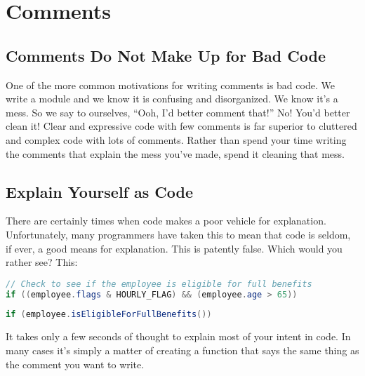 
\chapter{Comments}

\section{Comments Do Not Make Up for Bad Code}

One of the more common motivations for writing comments is bad code. We write a module
and we know it is confusing and disorganized. We know it's a mess. So we say to ourselves,
“Ooh, I'd better comment that!” No! You'd better clean it!
Clear and expressive code with few comments is far superior to cluttered and complex
code with lots of comments. Rather than spend your time writing the comments that
explain the mess you've made, spend it cleaning that mess.

\section{Explain Yourself as Code}

There are certainly times when code makes a poor vehicle for explanation. Unfortunately, many programmers have taken this to mean that code is seldom, if ever, a good means for explanation. This is patently false. Which would you rather see? This:

\begin{tcolorbox}[breakable, colback=blue!10!white, colframe=blue!85!black]

\begin{lstlisting}[language = java, basicstyle=\small]
// Check to see if the employee is eligible for full benefits
if ((employee.flags & HOURLY_FLAG) && (employee.age > 65))
\end{lstlisting}

\tcblower

\begin{lstlisting}[language = java, basicstyle=\small]
if (employee.isEligibleForFullBenefits())
\end{lstlisting}

\end{tcolorbox}

It takes only a few seconds of thought to explain most of your intent in code. In many cases it's simply a matter of creating a function that says the same thing as the comment you want to write.

